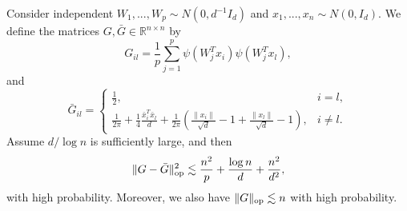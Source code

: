 \begin{lemma}\label{lem:lim-G-relu}
Consider independent $W_1,...,W_p\sim N(0,d^{-1}I_d)$ and $x_1,...,x_n\sim N(0,I_d)$. We define the matrices $G,\bar{G}\in\mathbb{R}^{n\times n}$ by
$$
G_{il}=\frac{1}{p}\sum_{j=1}^p\psi(W^T_jx_i)\psi(W_j^Tx_l),
$$
and
$$\bar{G}_{il}=\begin{cases}
\frac{1}{2}, & i=l, \\
\frac{1}{2\pi}+\frac{1}{4}\frac{\bar{x}_i^T\bar{x}_l}{d} + \frac{1}{2\pi}\left(\frac{\|x_i\|}{\sqrt{d}}-1+\frac{\|x_l\|}{\sqrt{d}}-1\right), & i\neq l.
\end{cases}$$
Assume $d/\log n$ is sufficiently large, and then
$$\|G-\bar{G}\|_{\rm op}^2\lesssim \frac{n^2}{p} + \frac{\log n}{d} + \frac{n^2}{d^2},$$
with high probability. Moreover, we also have $\|G\|_{\rm op}\lesssim n$ with high probability.
\end{lemma}
